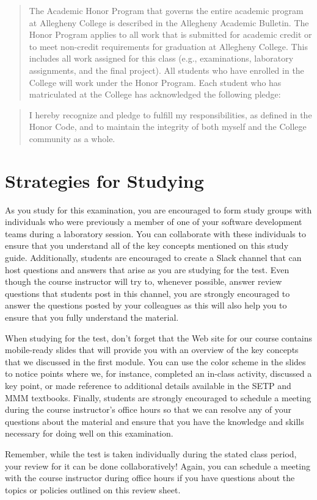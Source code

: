 \documentclass[11pt]{article}
\begin{document}
\begin{quote}

  The Academic Honor Program that governs the entire academic program at
  Allegheny College is described in the Allegheny Academic Bulletin. The Honor
  Program applies to all work that is submitted for academic credit or to meet
  non-credit requirements for graduation at Allegheny College. This includes all
  work assigned for this class (e.g., examinations, laboratory assignments, and
  the final project). All students who have enrolled in the College will work
  under the Honor Program. Each student who has matriculated at the College has
  acknowledged the following pledge:

\end{quote}

\begin{quote}

  I hereby recognize and pledge to fulfill my responsibilities, as defined in
  the Honor Code, and to maintain the integrity of both myself and the College
  community as a whole.

\end{quote}

\section*{Strategies for Studying}

As you study for this examination, you are encouraged to form study groups with
individuals who were previously a member of one of your software development
teams during a laboratory session. You can collaborate with these individuals to
ensure that you understand all of the key concepts mentioned on this study
guide. Additionally, students are encouraged to create a Slack channel that can
host questions and answers that arise as you are studying for the test. Even
though the course instructor will try to, whenever possible, answer review
questions that students post in this channel, you are strongly encouraged to
answer the questions posted by your colleagues as this will also help you to
ensure that you fully understand the material.

When studying for the test, don't forget that the Web site for our course
contains mobile-ready slides that will provide you with an overview of the key
concepts that we discussed in the first module. You can use the color scheme in
the slides to notice points where we, for instance, completed an in-class
activity, discussed a key point, or made reference to additional details
available in the SETP and MMM textbooks. Finally, students are strongly
encouraged to schedule a meeting during the course instructor's office hours so
that we can resolve any of your questions about the material and ensure that you
have the knowledge and skills necessary for doing well on this examination.

Remember, while the test is taken individually during the stated class period,
your review for it can be done collaboratively! Again, you can schedule a
meeting with the course instructor during office hours if you have questions
about the topics or policies outlined on this review sheet.
\end{document}
